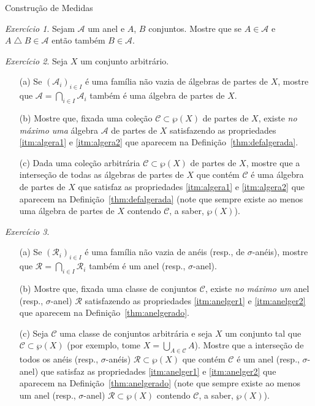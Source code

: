 \documentclass[oneside,final,11pt]{amsbook}
\theoremstyle{remark}\newtheorem{exercise}{Exercício}[chapter]
\theoremstyle{remark}\newtheorem{*exercise}[exercise]{\hbox to 0pt{\hskip 0pt minus 1fil*}Exercício}
\theoremstyle{definition}\newtheorem{exdefin}{Definição}[chapter]
\theoremstyle{plain}\newtheorem{teo}{Teorema}[section]
\theoremstyle{plain}\newtheorem{lem}[teo]{Lema}
\theoremstyle{plain}\newtheorem{prop}[teo]{Proposição}
\theoremstyle{plain}\newtheorem{cor}[teo]{Corolário}
\theoremstyle{definition}\newtheorem{defin}[teo]{Definição}
\theoremstyle{remark}\newtheorem{rem}[teo]{Observação}
\theoremstyle{definition}\newtheorem{notation}[teo]{Notação}
\theoremstyle{definition}\newtheorem{convention}[teo]{Convenção}
\theoremstyle{definition}\newtheorem{example}[teo]{Exemplo}
\numberwithin{section}{chapter}
\numberwithin{equation}{section}
\begin{document}
\begin{chapter}{Construção de Medidas}
\begin{exercise}
Sejam $\mathcal A$ um anel e $A$, $B$ conjuntos. Mostre que se $A\in\mathcal A$ e $A\bigtriangleup B\in\mathcal A$
então também $B\in\mathcal A$.
\end{exercise}

\begin{exercise}\label{exe:algerada}
Seja $X$ um conjunto arbitrário.
\begin{itemize}
\item[(a)] Se $(\mathcal A_i)_{i\in I}$ é uma família não vazia de álgebras de partes de $X$, mostre que
$\mathcal A=\bigcap_{i\in I}\mathcal A_i$ também é uma álgebra de partes de $X$.
\item[(b)] Mostre que, fixada uma coleção $\mathcal C\subset\wp(X)$ de partes de $X$, existe {\em no máximo uma\/}
álgebra $\mathcal A$ de partes de $X$ satisfazendo as propriedades \eqref{itm:algera1} e
\eqref{itm:algera2} que aparecem na Definição~\ref{thm:defalgerada}.
\item[(c)] Dada uma coleção arbitrária $\mathcal C\subset\wp(X)$ de partes de $X$, mostre que a interseção de todas
as álgebras de partes de $X$ que contém $\mathcal C$ é uma álgebra de partes de $X$ que satisfaz as propriedades
\eqref{itm:algera1} e \eqref{itm:algera2} que aparecem na Definição~\ref{thm:defalgerada} (note que sempre existe
ao menos uma álgebra de partes de $X$ contendo $\mathcal C$, a saber, $\wp(X)$).
\end{itemize}
\end{exercise}

\begin{exercise}\label{exe:anelgerado}
\
\begin{itemize}
\item[(a)] Se $(\mathcal R_i)_{i\in I}$ é uma família não vazia de anéis (resp., de $\sigma$-anéis), mostre que
$\mathcal R=\bigcap_{i\in I}\mathcal R_i$ também é um anel (resp., $\sigma$-anel).
\item[(b)] Mostre que, fixada uma classe de conjuntos $\mathcal C$, existe {\em no máximo um\/}
anel (resp., $\sigma$-anel) $\mathcal R$ satisfazendo as propriedades \eqref{itm:anelger1} e
\eqref{itm:anelger2} que aparecem na Definição~\ref{thm:anelgerado}.
\item[(c)] Seja $\mathcal C$ uma classe de conjuntos arbitrária e seja $X$ um conjunto tal que
$\mathcal C\subset\wp(X)$ (por exemplo, tome $X=\bigcup_{A\in\mathcal C}A$). Mostre que a interseção de todos
os anéis (resp., $\sigma$-anéis) $\mathcal R\subset\wp(X)$ que contém $\mathcal C$ é um anel (resp., $\sigma$-anel)
que satisfaz as propriedades \eqref{itm:anelger1} e \eqref{itm:anelger2} que aparecem na Definição~\ref{thm:anelgerado}
(note que sempre existe ao menos um anel (resp., $\sigma$-anel) $\mathcal R\subset\wp(X)$
contendo $\mathcal C$, a saber, $\wp(X)$).
\end{itemize}
\end{exercise}


\end{chapter}
\end{document}

